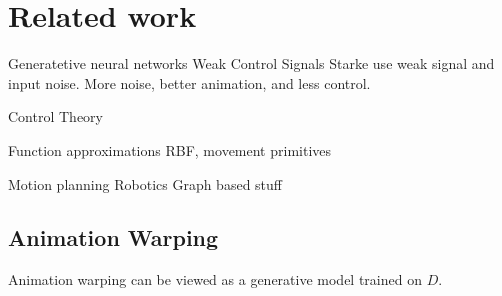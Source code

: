 \section{Related work}

Generatetive neural networks Weak Control Signals
    Starke use weak signal and input noise. More noise, better animation, and less control.


Control Theory

Function approximations 
    RBF, movement primitives

Motion planning
    Robotics
    Graph based stuff



\subsection{Animation Warping}
Animation warping can be viewed as a generative model trained on $D$. 

